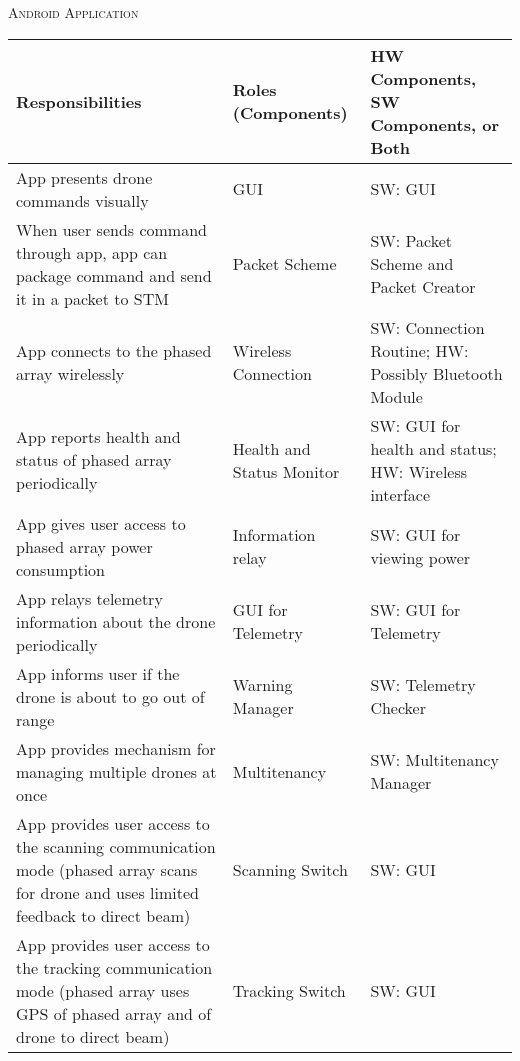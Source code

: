 \documentclass[RRC.tex]{subfiles}
\begin{document}
\bigskip

\begin{center}
	\textsc{\Large Android Application}
	\hrulefill
	\begin{tabular}{ | p{5cm} | p{5cm} | p{5cm} |}
		\hline
		Responsibilities & Roles (Components) & HW Components, SW Components, or Both \\ \hline
		App presents drone commands visually & GUI & SW: GUI \\ \hline
		When user sends command through app, app can package command and send it in a packet to STM & Packet Scheme & SW: Packet Scheme and Packet Creator \\ \hline
		App connects to the phased array wirelessly & Wireless Connection & SW: Connection Routine; HW: Possibly Bluetooth Module \\ \hline
		App reports health and status of phased array periodically & Health and Status Monitor & SW: GUI for health and status; HW: Wireless interface \\ \hline
		App gives user access to phased array power consumption & Information relay & SW: GUI for viewing power \\ \hline
		App relays telemetry information about the drone periodically & GUI for Telemetry & SW: GUI for Telemetry \\ \hline
		App informs user if the drone is about to go out of range & Warning Manager & SW: Telemetry Checker \\ \hline
		App provides mechanism for managing multiple drones at once & Multitenancy & SW: Multitenancy Manager \\ \hline
		App provides user access to the scanning communication mode (phased array scans for drone and uses limited feedback to direct beam) & Scanning Switch & SW: GUI \\ \hline
		App provides user access to the tracking communication mode (phased array uses GPS of phased array and of drone to direct beam) & Tracking Switch & SW: GUI \\ \hline
		
	\end{tabular}
\end{center}
\end{document}
